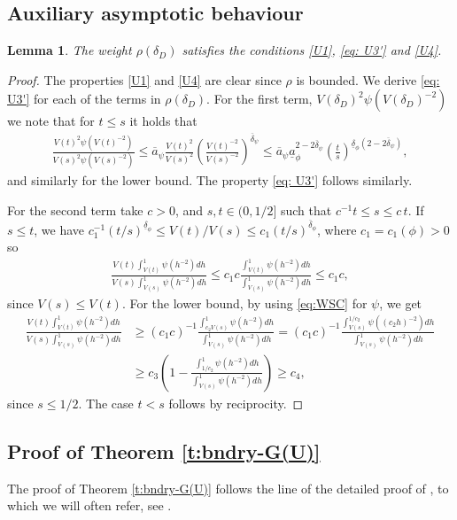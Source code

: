 \documentclass[12pt,a4paper,onecolumn]{article}
\newtheorem{lem}[thm]{Lemma}
\theoremstyle{definition}
\newcommand{\1}{\mathbf 1}
\newcommand{\de}{\delta_D}
\newcommand{\ua}[1]{\underline{a}_{#1}}
\newcommand{\oa}[1]{\overline{a}_{#1}}
\newcommand{\ud}[1]{\underline{\delta}_{#1}}
\newcommand{\od}[1]{\overline{\delta}_{#1}}
\numberwithin{equation}{section}
\begin{document}
    
    \subsection{Auxiliary asymptotic behaviour}
    
    \begin{lem}\label{ap:l:rho}
        The weight $\rho(\de)$ satisfies the conditions \ref{U1}, \eqref{eq: U3'} and \ref{U4}.
        
    \end{lem}
    \begin{proof}
        The properties \ref{U1} and \ref{U4} are clear since $\rho$ is bounded. We derive \eqref{eq: U3'} for each of the terms in $\rho(\de)$. For the first term, $V(\de)^2\psi(V(\de)^{-2})$ we note that for $t\le s$ it holds that
    \begin{align*}
        \frac{V(t)^2\psi(V(t)^{-2})}{V(s)^2\psi(V(s)^{-2})}\le \oa{\psi}\frac{V(t)^2}{V(s)^2}\left(\frac{V(t)^{-2}}{V(s)^{-2}}\right)^{\od{\psi}}\le \oa{\psi}\ua{\phi}^{2-2\od{\psi}}\left(\frac{t}{s}\right)^{\ud{\phi}(2-2\od{\psi})},
    \end{align*}
    and similarly for the lower bound. The property \eqref{eq: U3'} follows similarly.

    For the second term take $c>0$, and $s,t\in (0,1/2]$ such that $c^{-1}t\le s\le c\,t$. If $s\le t$, we have $c_1^{-1}(t/s)^{\ud{\phi}}\le V(t)/V(s)\le c_1 (t/s)^{\od{\phi}}$, where $c_1=c_1(\phi)>0$ so
    \begin{align*}
    	\frac{V(t)\int_{V(t)}^1\psi(h^{-2})dh}{V(s)\int_{V(s)}^1\psi(h^{-2})dh}\le c_1 c\frac{\int_{V(t)}^1\psi(h^{-2})dh}{\int_{V(s)}^1\psi(h^{-2})dh}\le c_1 c,
    \end{align*} 
    since $V(s)\le V(t)$. For the lower bound, by using \eqref{eq:WSC} for $\psi$, we get
    \begin{align*}
    	\frac{V(t)\int_{V(t)}^1\psi(h^{-2})dh}{V(s)\int_{V(s)}^1\psi(h^{-2})dh} &\ge (c_1 c)^{-1}\frac{\int_{c_2V(s)}^1\psi(h^{-2})dh}{\int_{V(s)}^1\psi(h^{-2})dh}=(c_1 c)^{-1}\frac{\int_{V(s)}^{1/c_2}\psi((c_2h)^{-2})dh}{\int_{V(s)}^1\psi(h^{-2})dh}\\
    	&\ge c_3 \left(1-\frac{\int_{1/c_2}^{1}\psi(h^{-2})dh}{\int_{V(s)}^1\psi(h^{-2})dh}\right)\ge c_4,
    \end{align*}
    since $s\le 1/2$. The case $t<s$ follows by reciprocity.
    \end{proof}

    
    
    \subsection{Proof of Theorem \ref{t:bndry-G(U)}}\label{ap:s:G(U) approx}
    The proof of Theorem \ref{t:bndry-G(U)} follows the line of  the detailed proof of \cite[Theorem 3.6]{Bio23cpaa},  to which we will often refer, see \cite[Appendix A.2]{Bio23cpaa}.
    
\end{document}
